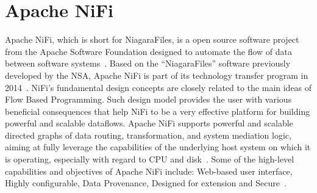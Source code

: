 \section{Apache NiFi}
Apache NiFi, which is short for NiagaraFiles, is a open source software project from the Apache 
Software Foundation designed to automate the flow of data between software 
systems~\cite{hid-sp18-405-wiki-nifi}. Based on the ``NiagaraFiles'' software previously developed by 
the NSA,  Apache NiFi is part of its technology transfer program in 2014~\cite{hid-sp18-405-wiki-nifi}. 
NiFi's fundamental design concepts are closely related to the main ideas of Flow Based Programming. 
Such design model provides the user with various beneficial consequences that help NiFi to be a very 
effective platform for building powerful and scalable dataflows. Apache NiFi supports powerful and 
scalable directed graphs of data routing, transformation, and system mediation logic, aiming at fully 
leverage the capabilities of the underlying host system on which it is operating, especially with regard 
to CPU and disk~\cite{hid-sp18-405-wwwoverview-nifi}. Some of the high-level capabilities and 
objectives of Apache NiFi include: Web-based user interface, Highly configurable, Data Provenance, 
Designed for extension and Secure~\cite{hid-sp18-405-www-nifi}.